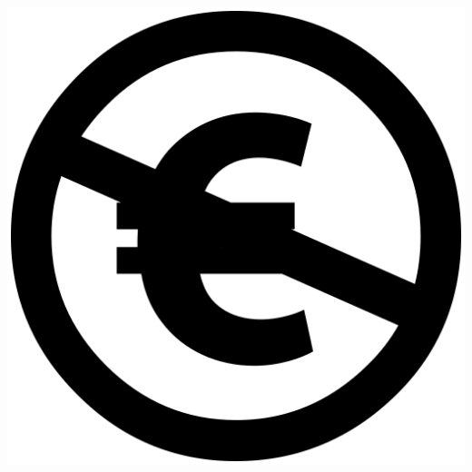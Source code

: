 \begin{center}
\includegraphics[scale=0.02]{./Images/Chapter00/nc-eu-xlarge.png}
\end{center}


\vfil
